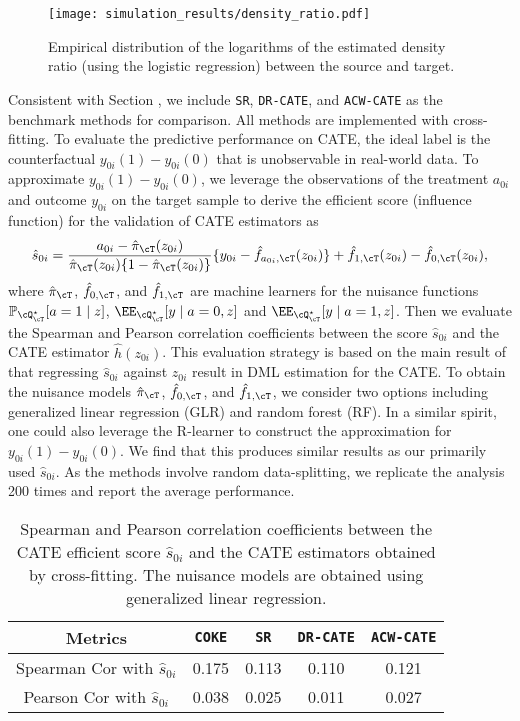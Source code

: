 \documentclass[12pt,a4paper,pdftex,onepage]{article}
\begin{document}
\begin{figure}[htbp!]
\centering
\texttt{[image: simulation\_results/density\_ratio.pdf]}
\caption{Empirical distribution of the logarithms of the estimated density ratio (using the logistic regression) between the source and target. 
}
\label{fig:densityratio}
\end{figure}


Consistent with Section , we include \texttt{SR}, \texttt{DR-CATE}, and \texttt{ACW-CATE} as the benchmark methods for comparison. All methods are implemented with cross-fitting. To evaluate the predictive performance on CATE, the ideal label is the counterfactual $y_{0i}(1)-y_{0i}(0)$ that is unobservable in real-world data. To approximate $y_{0i}(1)-y_{0i}(0)$, we leverage the observations of the treatment $a_{0i}$ and outcome $y_{0i}$ on the target sample to derive the efficient score (influence function) for the validation of CATE estimators as 
\[
\hat{s}_{0i}=\frac{a_{0i}-\hat \pi_{\cT}(z_{0i})}{\hat \pi_{\cT}(z_{0i})\{1-\hat \pi_{\cT}(z_{0i})\}}\{y_{0i}-\hat f_{a_{0i},{\cT}}(z_{0i})\}+\hat f_{1,{\cT}}(z_{0i})-\hat f_{0,{\cT}}(z_{0i}),
\]
where $\hat \pi_{\cT}$, $\hat f_{0,{\cT}}$, and $\hat f_{1,{\cT}}$ are machine learners for the nuisance functions $\mathbb{P}_{\cQ_\cT^\star}[a=1\mid z]$, $\EE_{\cQ_\cT^\star}[y \mid a=0, z]$ and $\EE_{\cQ_\cT^\star}[y \mid a=1, z]$. Then we evaluate the Spearman and Pearson correlation coefficients between the score $\hat{s}_{0i}$ and the CATE estimator $\hat{h}(z_{0i})$. This evaluation strategy is based on the main result of \cite{kennedy2020towards} that regressing $\hat{s}_{0i}$ against $z_{0i}$ result in DML estimation for the CATE. To obtain the nuisance models $\hat \pi_{\cT}$, $\hat f_{0,{\cT}}$, and $\hat f_{1,{\cT}}$, we consider two options including generalized linear regression (GLR) and random forest (RF). In a similar spirit, one could also leverage the R-learner \citep{nie2021quasi} to construct the approximation for $y_{0i}(1)-y_{0i}(0)$. We find that this produces similar results as our primarily used $\hat{s}_{0i}$. As the methods involve random data-splitting, we replicate the analysis 200 times and report the average performance. 



\begin{table}[htb!]
\centering
\begin{tabular}{|c|cccc|}
\hline Metrics & \texttt{COKE} & \texttt{SR} & \texttt{DR-CATE} & \texttt{ACW-CATE} \\
\hline Spearman Cor with $\hat{s}_{0i}$ & 0.175 & 0.113 & 0.110 & 0.121 \\
\hline Pearson Cor with $\hat{s}_{0i}$ & 0.038  & 0.025 & 0.011 & 0.027   \\ 
\hline
\end{tabular}
\caption{\label{tab:res:401:crossfit} Spearman and Pearson correlation coefficients between the CATE efficient score $\hat{s}_{0i}$ and the CATE estimators obtained by cross-fitting. The nuisance models are obtained using generalized linear regression.}
\end{table}
\end{document}
